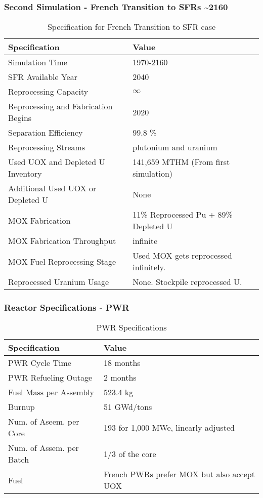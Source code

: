 \begin{frame}
	\frametitle{Second Simulation - French Transition to SFRs \textasciitilde 2160}
	
\begin{table}[h]
	\centering
	\begin{tabularx}{\textwidth}{bb}
		\hline
		Specification & Value \\
		\hline
		Simulation Time & 1970-2160 \\
		\gls{SFR} Available Year & 2040 \\
		Reprocessing Capacity & $\infty$ \\
		Reprocessing and Fabrication Begins & 2020 \\
		Separation Efficiency & 99.8 \% \\
		Reprocessing Streams & plutonium and uranium \\
		\small{Used \gls{UOX} and Depleted U Inventory} & 141,659 MTHM {\small (From first simulation)} \\
		\small{Additional Used \gls{UOX} or Depleted U} & None  \\
		\gls{MOX} Fabrication &  \small{11\% Reprocessed Pu + 89\% Depleted U}  \\
		\gls{MOX} Fabrication Throughput & infinite \\
		\gls{MOX} Fuel Reprocessing Stage &  Used \gls{MOX} gets reprocessed infinitely. \\
		Reprocessed Uranium Usage &  None. Stockpile reprocessed U. \\
		\hline
	\end{tabularx}
	\caption {Specification for French Transition to \gls{SFR} case }
	\label{tab:sim_france}
\end{table}

\end{frame}


\begin{frame}
	\frametitle{Reactor Specifications - PWR}
	
	\begin{table}[h]
	\centering
	\begin{tabularx}{\textwidth}{bb}
		\hline
		Specification & Value \\
		\hline
		PWR Cycle Time & 18 months \\ 
		PWR Refueling Outage & 2 months \\
		Fuel Mass per Assembly & 523.4 kg \\
		Burnup & 51 GWd/tons \\
		Num. of Aseem. per Core & 193 for 1,000 MWe, linearly adjusted\\
		Num. of Assem. per Batch & 1/3 of the core \\
		Fuel & \small{French \glspl{PWR} prefer \gls{MOX} but also accept \gls{UOX}}\\
		\hline
	\end{tabularx}
	\caption {\gls{PWR} Specifications}
	\label{tab:pwr}
	\end{table}
\end{frame}

